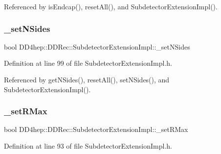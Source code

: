 Referenced by is\+Endcap(), reset\+All(), and Subdetector\+Extension\+Impl().

\hypertarget{class_d_d4hep_1_1_d_d_rec_1_1_subdetector_extension_impl_a1a8b0613327d2cac9e1783fcf7f22be9}{}\label{class_d_d4hep_1_1_d_d_rec_1_1_subdetector_extension_impl_a1a8b0613327d2cac9e1783fcf7f22be9} 
\subsubsection{\texorpdfstring{\+\_\+set\+N\+Sides}{\_setNSides}}
{\footnotesize\ttfamily bool D\+D4hep\+::\+D\+D\+Rec\+::\+Subdetector\+Extension\+Impl\+::\+\_\+set\+N\+Sides\hspace{0.3cm}{\ttfamily [protected]}}



Definition at line 99 of file Subdetector\+Extension\+Impl.\+h.



Referenced by get\+N\+Sides(), reset\+All(), set\+N\+Sides(), and Subdetector\+Extension\+Impl().

\hypertarget{class_d_d4hep_1_1_d_d_rec_1_1_subdetector_extension_impl_a8a23eb897b7a367cd183adddf88e8fe7}{}\label{class_d_d4hep_1_1_d_d_rec_1_1_subdetector_extension_impl_a8a23eb897b7a367cd183adddf88e8fe7} 
\subsubsection{\texorpdfstring{\+\_\+set\+R\+Max}{\_setRMax}}
{\footnotesize\ttfamily bool D\+D4hep\+::\+D\+D\+Rec\+::\+Subdetector\+Extension\+Impl\+::\+\_\+set\+R\+Max\hspace{0.3cm}{\ttfamily [protected]}}



Definition at line 93 of file Subdetector\+Extension\+Impl.\+h.



